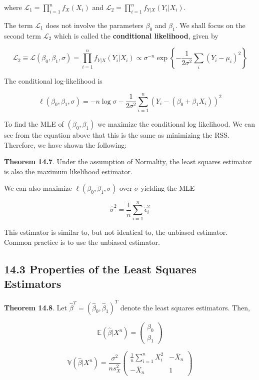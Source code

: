 where \(\mathcal{L}_1 = \prod_{i=1}^n f_X(X_i)\) and
\(\mathcal{L}_2 = \prod_{i=1}^n f_{Y|X}(Y_i | X_i)\).

The term \(\mathcal{L}_1\) does not involve the parameters \(\beta_0\)
and \(\beta_1\). We shall focus on the second term \(\mathcal{L}_2\)
which is called the \textbf{conditional likelihood}, given by

\[\mathcal{L}_2 \equiv \mathcal{L}(\beta_0, \beta_1, \sigma)
= \prod_{i=1}^n f_{Y|X}(Y_i | X_i)
\propto \sigma^{-n} \exp \left\{ - \frac{1}{2 \sigma^2} \sum_i (Y_i - \mu_i)^2 \right\}
\]

The conditional log-likelihood is

\[\ell(\beta_0, \beta_1, \sigma) = -n \log \sigma - \frac{1}{2 \sigma^2} \sum_{i=1}^n \left(Y_i - (\beta_0 + \beta_1 X_i) \right)^2\]

To find the MLE of \((\beta_0, \beta_1)\) we maximize the conditional
log likelihood. We can see from the equation above that this is the same
as minimizing the RSS. Therefore, we have shown the following:

\textbf{Theorem 14.7}. Under the assumption of Normality, the least
squares estimator is also the maximum likelihood estimator.

We can also maximize \(\ell(\beta_0, \beta_1, \sigma)\) over \(\sigma\)
yielding the MLE

\[ \hat{\sigma}^2 = \frac{1}{n} \sum_{i=1}^n \hat{\epsilon}_i^2 \]

This estimator is similar to, but not identical to, the unbiased
estimator. Common practice is to use the unbiased estimator.

\subsection{14.3 Properties of the Least Squares
Estimators}\label{properties-of-the-least-squares-estimators}

\textbf{Theorem 14.8}. Let
\(\hat{\beta}^T = (\hat{\beta}_0, \hat{\beta}_1)^T\) denote the least
squares estimators. Then,

\[
\mathbb{E}(\hat{\beta} | X^n) = \begin{pmatrix}\beta_0 \\ \beta_1 \end{pmatrix}
\]

\[
\mathbb{V}(\hat{\beta} | X^n) = \frac{\sigma^2}{n s_X^2} \begin{pmatrix} 
\frac{1}{n} \sum_{i=1}^n X_i^2 & -\overline{X}_n \\
-\overline{X}_n & 1
\end{pmatrix}
\]

